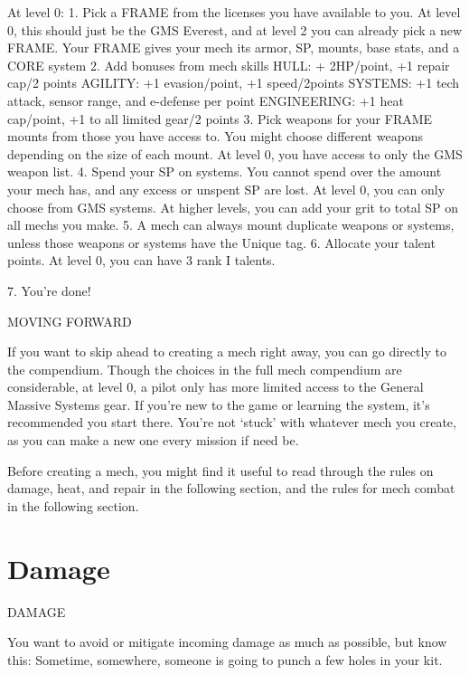 At level 0:
     1.  Pick a FRAME from the licenses you have available to you. At level 0, this should just be
         the GMS Everest, and at level 2 you can already pick a new FRAME. Your FRAME gives
         your mech its armor, SP, mounts, base stats, and a CORE system
    2.   Add bonuses from mech skills
                 HULL: + 2HP/point, +1 repair cap/2 points
                 AGILITY: +1 evasion/point, +1 speed/2points
                 SYSTEMS: +1 tech attack, sensor range, and e-defense per point
                 ENGINEERING: +1 heat cap/point, +1 to all limited gear/2 points
    3.   Pick weapons for your FRAME mounts from those you have access to. You might choose
         different weapons depending on the size of each mount. At level 0, you have access to
         only the GMS weapon list.
    4.   Spend your SP on systems. You cannot spend over the amount your mech has, and any
         excess or unspent SP are lost. At level 0, you can only choose from GMS systems. At
         higher levels, you can add your grit to total SP on all mechs you make.
    5.   A mech can always mount duplicate weapons or systems, unless those weapons or
         systems have the Unique tag.
    6.   Allocate your talent points. At level 0, you can have 3 rank I talents.

    7.   You’re done!





                                             MOVING FORWARD

If you want to skip ahead to creating a mech right away, you can go directly to the compendium.
Though the choices in the full mech compendium are considerable, at level 0, a pilot only has
more limited access to the General Massive Systems gear. If you’re new to the game or learning
the system, it’s recommended you start there. You’re not ‘stuck’ with whatever mech you create,
as you can make a new one every mission if need be.

Before creating a mech, you might find it useful to read through the rules on damage, heat, and
repair in the following section, and the rules for mech combat in the following section.

\section{Damage}
 DAMAGE

You want to avoid or mitigate incoming damage as much as possible, but know this: Sometime,
somewhere, someone is going to punch a few holes in your kit.


